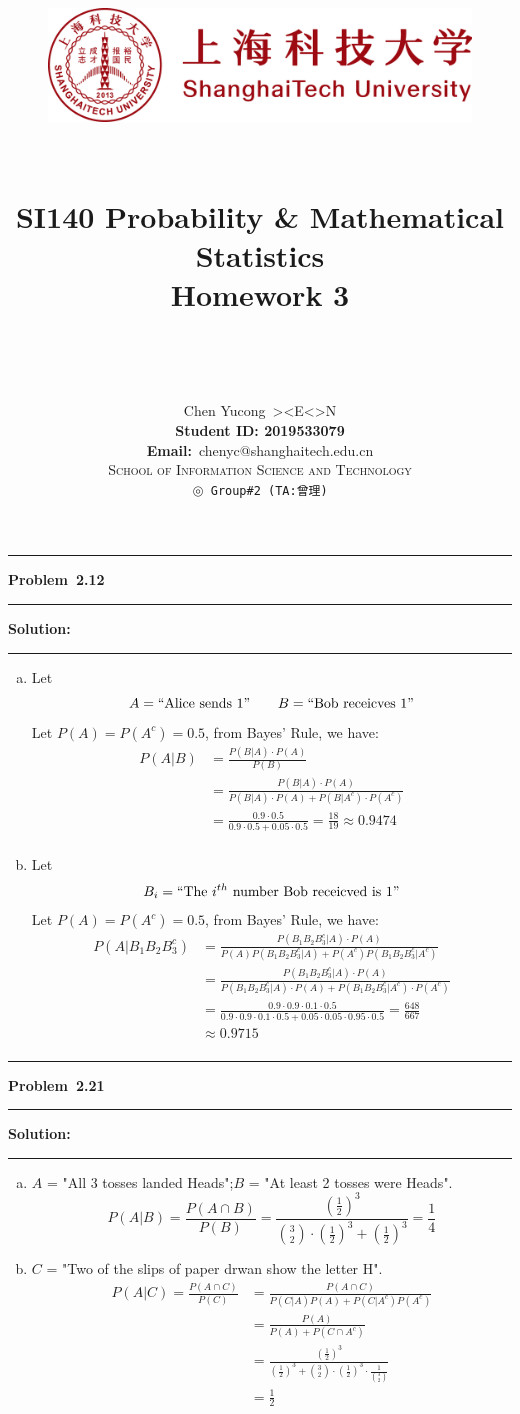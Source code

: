 \documentclass[10.5pt]{article}
\title{
	\normalfont \normalsize
	\begin{figure}[!h]
	\centering
	\includegraphics[width=4.8in, keepaspectratio]{logo_red.pdf}\\[1cm]
	\end{figure}
	\horrule{0.5pt} \\[0.4cm]
	\Huge SI140 Probability \& Mathematical Statistics\\[0.4cm]
	\LARGE Homework 3\\
	\horrule{2pt} \\[1.5cm]
}
\author{\Song{\huge\textbf{陈昱聪}}\\[0.2cm]Chen Yucong\ ><E<>N\\[4.5cm]\textbf{Student ID: 2019533079}\\[0.2cm] 
\textbf{Email:}\ {\ttfamily chenyc@shanghaitech.edu.cn}\\[0.8cm] \LARGE\textsc{School of Information Science and Technology}\\[0.63cm]
\texttt{$\circledcirc$ Group\#2\ (TA:曾理)}}
\date{}
\newcommand\question[1]{\vspace{.2in}\hrule\vspace{0.04in}\textbf{Problem\ #1}\vspace{.4em}\hrule\vspace{.10in}}
\newcommand\Solution{\vspace{.3in}\textbf{Solution:}\vspace{.5em}\hrule\vspace{.08in}\par}
\begin{document}
	
\maketitle
\thispagestyle{firstpage}
\thispagestyle{empty}
\setcounter{page}{0}

\pagebreak

\question{2.12}
	\Solution{}
		\begin{enumerate}[(a)]
			\item Let $$A = ``\text{Alice sends}\ 1" \qquad B = ``\text{Bob receicves}\ 1"$$
			Let $P(A) = P(A^c) = 0.5$, from Bayes' Rule, we have:
			\begin{align*}
				P(A|B)&=\frac{P(B|A)\cdot P(A)}{P(B)}\\[8pt]
				&=\frac{P(B|A)\cdot P(A)}{P(B|A)\cdot P(A) + P(B|A^c)\cdot P(A^c)}\\[8pt]
				&=\frac{0.9\cdot0.5}{0.9\cdot0.5+0.05\cdot0.5}=\frac{18}{19}\approx 0.9474\\[8pt]
			\end{align*}

			\item Let $$B_i = ``\text{The $i^{th}$ number Bob receicved is}\ 1"$$
			Let $P(A) = P(A^c) = 0.5$, from Bayes' Rule, we have:
			\begin{align*}
				P(A|B_1B_2B_3^c)&=\frac{P(B_1B_2B_3^c|A)\cdot P(A)}{P(A)P(B_1B_2B_3^c|A)+P(A^c)P(B_1B_2B_3^c|A^c)}\\[8pt]
				&=\frac{P(B_1B_2B_3^c|A)\cdot P(A)}{P(B_1B_2B_3^c|A)\cdot P(A) + P(B_1B_2B_3^c|A^c)\cdot P(A^c)}\\[8pt]
				&=\frac{0.9\cdot0.9\cdot0.1\cdot0.5}{0.9\cdot0.9\cdot0.1\cdot0.5+0.05\cdot0.05\cdot0.95\cdot0.5} = \frac{648}{667}\\[8pt]&\approx0.9715\\[8pt]
			\end{align*}
		\end{enumerate}
		
       
\vspace{2cm}

\pagebreak

\question{2.21}
	\Solution{}
	\begin{enumerate}[(a)]
		\item $A$ = "All 3 tosses landed Heads";\quad $B$ = "At least 2 tosses were Heads".
		$$P(A|B) = \frac{P(A\cap B)}{P(B)} = \frac{(\frac{1}{2})^3}{\binom{3}{2}\cdot(\frac{1}{2})^3+(\frac{1}{2})^3}=\frac{1}{4}$$
		\vspace{2cm}
		\item $C$ = "Two of the slips of paper drwan show the letter H".
		\begin{align*}
			P(A|C) = \frac{P(A\cap C)}{P(C)}&=\frac{P(A\cap C)}{P(C|A)P(A)+P(C|A^c)P(A^c)}\\[8pt]
			&= \frac{P(A)}{P(A)+P(C\cap A^c)}\\[8pt]
			&=\frac{(\frac{1}{2})^3}{(\frac{1}{2})^3+\binom{3}{2}\cdot(\frac{1}{2})^3\cdot\frac{1}{\binom{3}{2}}}\\[8pt]
			&=\frac{1}{2}
		\end{align*}

	\end{enumerate}
\end{document}
